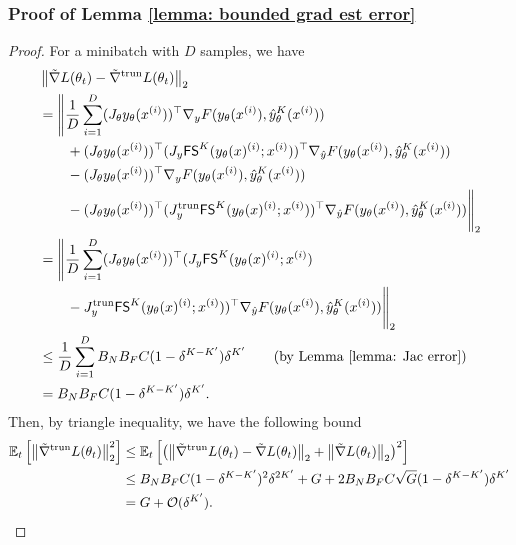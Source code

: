 \documentclass{article}
\def\E{\mathbb{E}}
\def\FS{\mathsf{FS}}
\def\tgrad{\Tilde{\nabla}}
\newcommand{\bigO}{\mathcal{O}}
\def\x{x}
\def\y{y_{\theta}}   \def\hy{\hat{y}_{\theta}}    \def\ty{\Tilde{y}}
\def\i{{(i)}}
\def\trun{\mathrm{trun}}
\begin{document}
\subsubsection{Proof of Lemma \ref{lemma: bounded grad est error}}

\begin{proof}
    For a minibatch with $D$ samples, we have
    \begin{align}
        &\left\| \tgrad L(\theta_t) - \tgrad^\mathrm{trun} L(\theta_t) \right\|_2 \nonumber\\
        &= \Bigg\| \frac{1}{D} \sum_{i=1}^D
         (J_\theta \y (x^\i))^\top \nabla_y F(\y(\x^\i), \hy^K(\x^\i)) \nonumber\\
         &\qquad + (J_\theta \y (x^\i))^\top (J_y \FS^K(\y(\x)^\i; \x^\i))^\top \nabla_{\hat{y}} F(\y(\x^\i), \hy^K(\x^\i))  \nonumber\\
         &\qquad - (J_\theta \y (x^\i))^\top \nabla_y F(\y(\x^\i), \hy^K(\x^\i)) \nonumber\\
         &\qquad - (J_\theta \y (x^\i))^\top (J_y^\trun \FS^K(\y(\x)^\i; \x^\i))^\top \nabla_{\hat{y}} F(\y(\x^\i), \hy^K(\x^\i)) \Bigg\|_2 \nonumber\\
         &= \Bigg\| \frac{1}{D} \sum_{i=1}^D  (J_\theta \y (x^\i))^\top (J_y \FS^K(\y(\x)^\i; \x^\i) \nonumber\\
         &\qquad - J_y^\trun \FS^K(\y(\x)^\i; \x^\i))^\top \nabla_{\hat{y}} F(\y(\x^\i), \hy^K(\x^\i)) \Bigg\|_2 \nonumber\\
         &\leq \frac{1}{D} \sum_{i=1}^D B_N B_F C (1 - \delta^{K-K'})\delta^{K'} \qquad \text{(by Lemma \ref{lemma: Jac error})} \nonumber \\
         &= B_N B_F C (1 - \delta^{K-K'})\delta^{K'}. \label{eq: estimated grad bound}
    \end{align}
    Then, by triangle inequality, we have the following bound 
    \begin{align*}
        \E_t \left[ \left\| \tgrad^\mathrm{trun} L(\theta_t) \right\|^2_2\right] &\leq \E_t \left[ \left(\left\|  \tgrad^\mathrm{trun} L(\theta_t) - \tgrad L(\theta_t)  \right\|_2 + \left\| \tgrad L(\theta_t) \right\|_2 \right)^2 \right] \\
        &\leq B_N B_F C (1 - \delta^{K-K'})^2\delta^{2K'} + G + 2 B_N B_F C\sqrt{G}(1 - \delta^{K-K'})\delta^{K'} \\
        &= G + \bigO(\delta^{K'}).
    \end{align*}


\end{proof}
\end{document}
